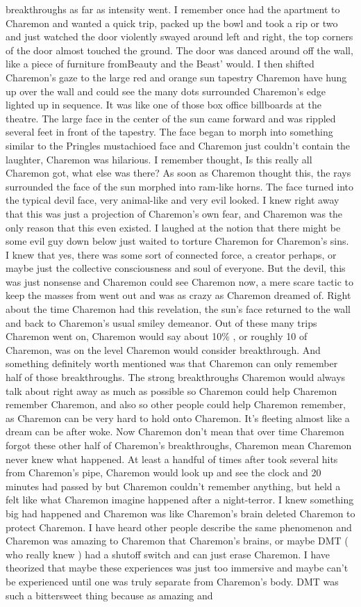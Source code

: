 \documentclass[12pt]{book}
\begin{document}
breakthroughs as far as intensity went. I remember once had the apartment to Charemon and wanted a quick trip, packed up the bowl and took a rip or two and just watched the door violently swayed around left and right, the top corners of the door almost touched the ground. The door was danced around off the wall, like a piece of furniture fromBeauty and the Beast' would. I then shifted Charemon's gaze to the large red and orange sun tapestry Charemon have hung up over the wall and could see the many dots surrounded Charemon's edge lighted up in sequence. It was like one of those box office billboards at the theatre. The large face in the center of the sun came forward and was rippled several feet in front of the tapestry. The face began to morph into something similar to the Pringles mustachioed face and Charemon just couldn't contain the laughter, Charemon was hilarious. I remember thought, Is this really all Charemon got, what else was there?  As soon as Charemon thought this, the rays surrounded the face of the sun morphed into ram-like horns. The face turned into the typical devil face, very animal-like and very evil looked. I knew right away that this was just a projection of Charemon's own fear, and Charemon was the only reason that this even existed. I laughed at the notion that there might be some evil guy down below just waited to torture Charemon for Charemon's sins. I knew that yes, there was some sort of connected force, a creator perhaps, or maybe just the collective consciousness and soul of everyone. But the devil, this was just nonsense and Charemon could see Charemon now, a mere scare tactic to keep the masses from went out and was as crazy as Charemon dreamed of. Right about the time Charemon had this revelation, the sun's face returned to the wall and back to Charemon's usual smiley demeanor. Out of these many trips Charemon went on, Charemon would say about 10\% , or roughly 10 of Charemon, was on the level Charemon would consider breakthrough. And something definitely worth mentioned was that Charemon can only remember half of those breakthroughs. The strong breakthroughs Charemon would always talk about right away as much as possible so Charemon could help Charemon remember Charemon, and also so other people could help Charemon remember, as Charemon can be very hard to hold onto Charemon. It's fleeting almost like a dream can be after woke. Now Charemon don't mean that over time Charemon forgot these other half of Charemon's breakthroughs, Charemon mean Charemon never knew what happened.  At least a handful of times after took several hits from Charemon's pipe, Charemon would look up and see the clock and 20 minutes had passed by but Charemon couldn't remember anything, but held a felt like what Charemon imagine happened after a night-terror. I knew something big had happened and Charemon was like Charemon's brain deleted Charemon to protect Charemon. I have heard other people describe the same phenomenon and Charemon was amazing to Charemon that Charemon's brains, or maybe DMT ( who really knew ) had a shutoff switch and can just erase Charemon. I have theorized that maybe these experiences was just too immersive and maybe can't be experienced until one was truly separate from Charemon's body. DMT was such a bittersweet thing because as amazing and 
\end{document}
